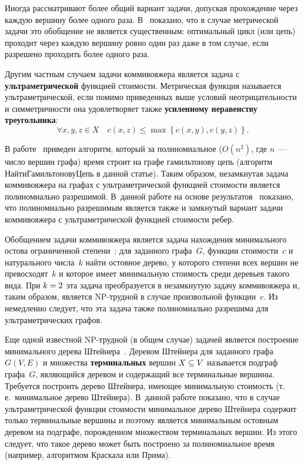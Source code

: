 \begin{multicols}{2}
Иногда рассматривают более общий вариант задачи, допуская прохождение через каждую
вершину более одного раза. В~\cite{Meinika} показано, что в случае мет\-ри\-че\-ской задачи это
обобщение не является существенным: оптимальный цикл (или цепь) проходит через
каждую вершину ровно один раз даже в том случае, если разрешено проходить
более одного \mbox{раза}.

Другим частным случаем задачи коммивояжера является задача с \textbf{ульт\-ра\-мет\-рической}
функцией стоимости. Метрическая функция называется ульт\-ра\-мет\-ри\-че\-ской, если помимо
приведенных выше условий неотрицательности и симметричности она удовлетворяет также
\textbf{усиленному неравенству треугольника}:
$$
\forall x,y,z \in X \quad c(x,z) \leq \max\left\{c(x,y), c(y,z)\right\}.
$$

В работе~\cite{Gusfield} приведен алгоритм, который за полиномиальное
($O(n^2)$, где $n$~--- число вершин графа) время строит на графе гамильтонову цепь
(алгоритм {\sf НайтиГамильтоновуЦепь} в данной \mbox{статье}).
Таким образом, незамкнутая задача коммивояжера на графах с
ультраметрической функцией сто\-и\-мости
является полиномиально разрешимой.
В~данной работе на основе результатов~\cite{Gusfield} показано, что полиномиально разрешимым
является также и за\-мк\-ну\-тый вариант задачи коммивояжера с ульт\-ра\-мет\-ри\-че\-ской функцией стоимости ребер.

Обобщением задачи коммивояжера является задача нахождения
минимального остова ограниченной степени~\cite{Gary_Johnson, Bui}:
для заданного графа~$G$, функции стоимости~$c$ и натурального числа~$k$
найти остовное дерево, у которого степени всех вершин не
превосходят~$k$ и которое имеет минимальную стоимость среди деревьев
такого вида. При $k\hm=2$ эта задача преобразуется в незамкнутую задачу
коммивояжера и, таким образом, является NP-труд\-ной в случае
произвольной функции~$c$. Из~\cite{Gusfield} немедленно следует, что
эта задача также полиномиально разрешима для ультраметрических
графов.

Еще одной известной NP-труд\-ной (в общем случае) задачей является
построение минимального дерева Штейнера~\cite{Gary_Johnson}. Деревом
Штейнера для заданного графа $G(V,E)$ и множества \textbf{терминальных}
вершин $X \hm\subseteq V$ называется подграф графа~$G$, являющийся
деревом и содержащий все терминальные вершины. Требуется построить
дерево Штейнера, имеющее минимальную стоимость (т.\,е.\ минимальное
дерево Штейнера). В~данной работе показано, что в случае
ультраметрической функции стоимости минимальное дерево Штейнера
содержит только терминальные вершины и поэтому является минимальным
остовным деревом на подграфе, порожденном множеством терминальных
вершин. Из этого следует, что такое дерево может быть построено за
полиномиальное время (например, алгоритмом Краскала или Прима).


\end{multicols}
